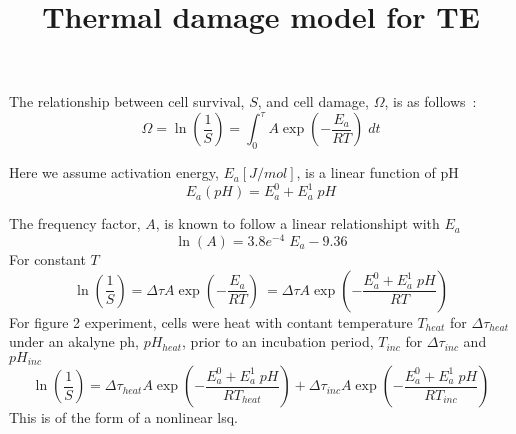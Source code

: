 \documentclass{article}         %
\title{Thermal damage model for TE}
\author{}
\theoremstyle{definition}
\theoremstyle{remark}
\begin{document}
                

The relationship between cell survival, $S$, and cell
damage, $\Omega$, is as follows~\cite{he2003quantification}:
\[
\Omega = \ln \left(\frac{1}{S}\right)
       = \int_0^\tau  A \exp\left( -\frac{E_a}{R T} \right)\; dt
\]

Here we assume activation energy, $E_a [J/mol]$, is a linear function of pH
\[
   E_a(pH) = E_a^0 + E_a^1  \; pH
\]

The frequency factor, $A$, is known to follow a linear relationshipt with $E_a$
\[
  \ln (A) = 3.8e^{-4} \; E_a  - 9.36
\]
For constant $T$
\[
         \ln \left(\frac{1}{S}\right)
       = \Delta\tau  A \exp\left( -\frac{E_a}{R T} \right)\
       = \Delta\tau  A \exp\left( -\frac{E_a^0 + E_a^1  \; pH}{R T} \right)
\]
For figure 2 experiment, cells were heat with contant temperature $T_{heat}$ for $\Delta \tau_{heat}$
under an akalyne ph, $pH_{heat}$,
prior to an incubation period, $T_{inc}$ for $\Delta \tau_{inc}$ and $pH_{inc}$
\[
         \ln \left(\frac{1}{S}\right)
       = \Delta\tau_{heat}  A \exp\left( -\frac{E_a^0 + E_a^1  \; pH}{R T_{heat}} \right)
       + \Delta\tau_{inc}  A \exp\left( -\frac{E_a^0 + E_a^1  \; pH}{R T_{inc}} \right)
\]
This is of the form of a nonlinear lsq.
\end{document}
